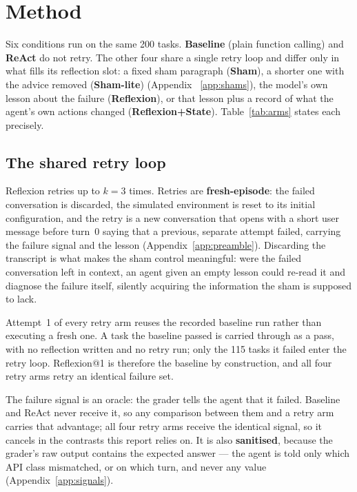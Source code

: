 \documentclass[a4paper, 12pt]{article}
\begin{document}
\section{Method}

Six conditions run on the same 200 tasks. \textbf{Baseline} (plain function calling)
and \textbf{ReAct} do not retry. The other four share a single retry loop and differ
only in what fills its reflection slot: a fixed sham paragraph (\textbf{Sham}),
a shorter one with the advice removed (\textbf{Sham-lite}) (Appendix ~\ref{app:shams}),
the model's own lesson about the failure (\textbf{Reflexion}), or that lesson plus a record
of what the agent's own actions changed (\textbf{Reflexion+State}). Table~\ref{tab:arms} states each precisely.

\subsection{The shared retry loop}

Reflexion retries up to $k=3$ times. Retries are \textbf{fresh-episode}: the
failed conversation is discarded, the simulated environment is reset to its
initial configuration, and the retry is a new conversation that opens
with a short user message before turn~0 saying that a previous, separate attempt
failed, carrying the failure signal and the lesson (Appendix~\ref{app:preamble}).
Discarding the transcript is what makes the sham control meaningful: were the
failed conversation left in context, an agent given an empty lesson could
re-read it and diagnose the failure itself, silently acquiring the information
the sham is supposed to lack.

Attempt~1 of every retry arm reuses the recorded baseline run rather than executing
a fresh one. A task the baseline passed is carried through as a pass, with no reflection
written and no retry run; only the 115 tasks it failed enter the retry loop. Reflexion@1 is
therefore the baseline by construction, and all four retry arms retry an identical failure set.

The failure signal is an oracle: the grader tells the agent that it failed. Baseline and ReAct
never receive it, so any comparison between them and a retry arm carries that advantage;
all four retry arms receive the identical signal, so it cancels in the contrasts this report relies on.
It is also \textbf{sanitised}, because the grader's raw output contains the expected answer
--- the agent is told only which API class mismatched, or on which turn, and never any value (Appendix~\ref{app:signals}).
\end{document}
